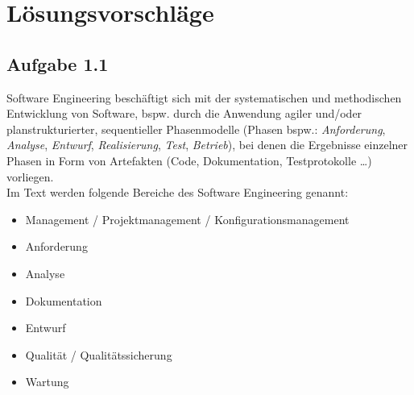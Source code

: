 \section{Lösungsvorschläge}

\subsection{Aufgabe 1.1}

Software Engineering beschäftigt sich mit der systematischen und methodischen Entwicklung von Software, bspw. durch die Anwendung agiler und/oder planstrukturierter, sequentieller Phasenmodelle (Phasen bspw.: \textit{Anforderung}, \textit{Analyse}, \textit{Entwurf}, \textit{Realisierung}, \textit{Test}, \textit{Betrieb}), bei denen die Ergebnisse einzelner Phasen in Form von Artefakten (Code, Dokumentation, Testprotokolle \ldots) vorliegen.\\
Im Text werden folgende Bereiche des Software Engineering genannt:
\begin{itemize}
    \item Management / Projektmanagement / Konfigurationsmanagement
    \item Anforderung
    \item Analyse
    \item Dokumentation
    \item Entwurf
    \item Qualität / Qualitätssicherung
    \item Wartung
\end{itemize}